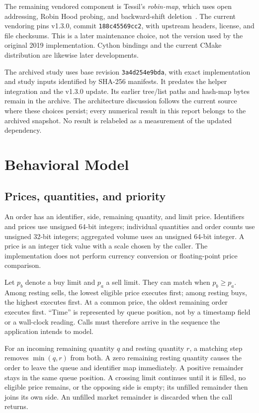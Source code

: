 \documentclass[10pt,letterpaper,twocolumn]{article}
\newcommand{\code}[1]{\texttt{#1}}
\begin{document}
The remaining vendored component is Tessil's \emph{robin-map}, which uses
open addressing, Robin Hood probing, and backward-shift deletion~\cite{robin}.
The current vendoring pins v1.3.0, commit \code{188c45569cc2}, with upstream
headers, license, and file checksums. This is a later maintenance choice,
not the version used by the original 2019 implementation. Cython bindings
and the current CMake distribution are likewise later developments.

The archived study uses base revision \code{3a4d254e9bda}, with exact
implementation and study inputs identified by SHA-256 manifests. It predates
the helper integration and the v1.3.0 update. Its earlier tree/list paths and
hash-map bytes remain in the archive. The architecture discussion follows
the current source where these choices persist; every numerical result in
this report belongs to the archived snapshot. No result is relabeled as a
measurement of the updated dependency.

\section{Behavioral Model}
\subsection{Prices, quantities, and priority}
An order has an identifier, side, remaining quantity, and limit price.
Identifiers and prices use unsigned 64-bit integers; individual quantities
and order counts use unsigned 32-bit integers; aggregated volume uses an
unsigned 64-bit integer. A price is an integer tick value with a scale chosen
by the caller. The implementation does not perform currency conversion or
floating-point price comparison.

Let $p_b$ denote a buy limit and $p_a$ a sell limit. They can match when
$p_b\geq p_a$. Among resting sells, the lowest eligible price executes first;
among resting buys, the highest executes first. At a common price, the oldest
remaining order executes first. ``Time'' is represented by queue position,
not by a timestamp field or a wall-clock reading. Calls must therefore arrive
in the sequence the application intends to model.

For an incoming remaining quantity $q$ and resting quantity $r$, a matching
step removes $\min(q,r)$ from both. A zero remaining resting quantity causes
the order to leave the queue and identifier map immediately. A positive
remainder stays in the same queue position. A crossing limit continues until
it is filled, no eligible price remains, or the opposing side is empty; its
unfilled remainder then joins its own side. An unfilled market remainder is
discarded when the call returns.
\end{document}
